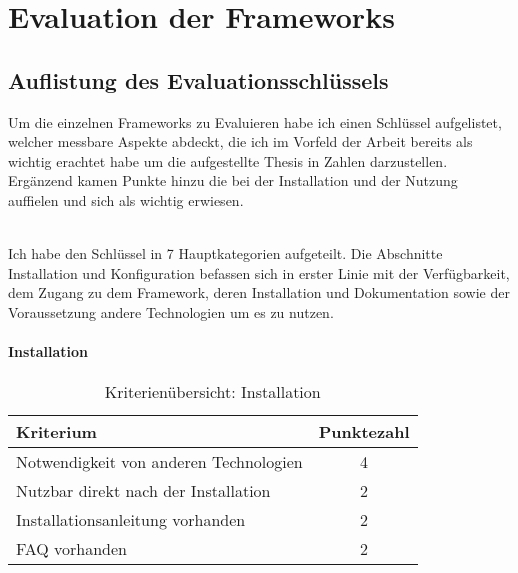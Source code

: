 \chapter{Evaluation der Frameworks}
\section{Auflistung des Evaluationsschlüssels}

Um die einzelnen Frameworks zu Evaluieren habe ich einen Schlüssel aufgelistet, welcher messbare Aspekte abdeckt, die ich im Vorfeld der Arbeit bereits als wichtig erachtet habe um die aufgestellte Thesis in Zahlen darzustellen. Ergänzend kamen Punkte hinzu die bei der Installation und der Nutzung auffielen und sich als wichtig erwiesen. 

\\Ich habe den Schlüssel in 7 Hauptkategorien aufgeteilt. Die Abschnitte Installation und Konfiguration befassen sich in erster Linie mit der Verfügbarkeit, dem Zugang zu dem Framework, deren Installation und Dokumentation sowie der Voraussetzung andere Technologien um es zu nutzen.

\subsubsection{Installation}
\begin{table}[H]
 	\vspace{-30pt}
 	\centering
		\begin{tabular}{| p{12cm} | c|}
			\hline
				Kriterium		 &	Punktezahl\\
			\hline
			\hline
				Notwendigkeit von anderen Technologien				&4\\
				Nutzbar direkt nach der Installation			&	2	\\
				Installationsanleitung vorhanden			&	2	\\
				FAQ vorhanden				&	2	\\
				\hline
		\end{tabular}
	\caption{Kriterienübersicht: Installation}
\end{table}

